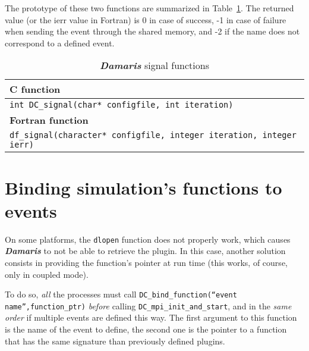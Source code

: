 \documentclass[11pt]{report}
\newcommand{\Damaris}{\emph{\textbf{Damaris}}}
\newcommand{\function}[1]{\texttt{#1}}
\begin{document}
\noindent\begin{minipage}{\textwidth}
\vspace{0.5cm}

\end{minipage}

\noindent\begin{minipage}{\textwidth}

\end{minipage}

The prototype of these two functions are summarized in Table~\ref{tab:signalFunctions}. The returned
value (or the ierr value in Fortran) is 0 in case of success, -1 in case of failure when sending the
event through the shared memory, and -2 if the name does not correspond to a defined event.

\begin{table}[h]
\centering
\begin{tabular}{|l|}
	\hline
   \textbf{C function} \\
   \hline
   \hline
   \function{int DC\_signal(char* configfile, int iteration)}  \\
   \hline
   \hline
   \textbf{Fortran function} \\
   \hline
   \hline
   \function{df\_signal(character* configfile, integer iteration, integer ierr)} \\
   \hline
\end{tabular}\caption{\Damaris{} signal functions}\label{tab:signalFunctions}
\end{table}

\section{Binding simulation's functions to events}

On some platforms, the \texttt{dlopen} function does not properly work, which causes \Damaris{} to not
be able to retrieve the plugin. In this case, another solution consists in providing the function's pointer
at run time (this works, of course, only in coupled mode).

To do so, \emph{all} the processes must call \texttt{DC\_bind\_function(``event name'',function\_ptr)} \emph{before}
calling \texttt{DC\_mpi\_init\_and\_start}, and in the \emph{same order} if multiple events are defined this way. 
The first argument to this function is the name of the event to define,
the second one is the pointer to a function that has the same signature than previously defined plugins.
\end{document}
